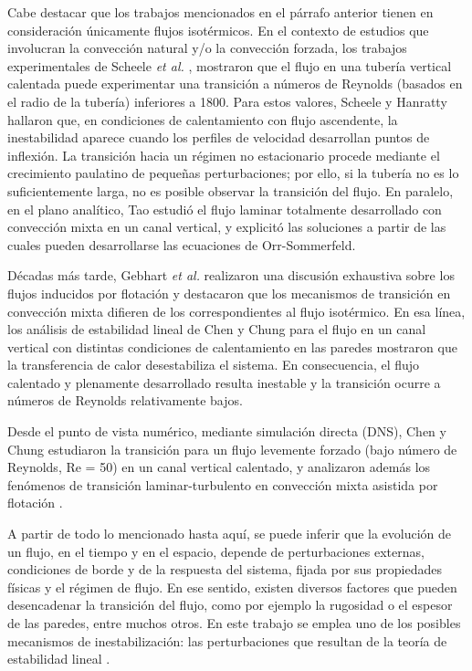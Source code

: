 Cabe destacar que los trabajos mencionados en el párrafo anterior tienen en consideración únicamente flujos isotérmicos. En el contexto de estudios que involucran la convección natural y/o la convección forzada, los trabajos experimentales de Scheele \textit{et al.}  \cite{scheele1960effect}, \cite{scheele1962effect} mostraron que el flujo en una tubería vertical calentada puede experimentar una transición a números de Reynolds (basados en el radio de la tubería) inferiores a 1800. Para estos valores, Scheele y \linebreak  Hanratty \cite{scheele1962effect} hallaron que, en condiciones de calentamiento con flujo ascendente, la inestabilidad aparece cuando los perfiles de velocidad \linebreak  desarrollan puntos de inflexión. La transición hacia un régimen no estacionario procede mediante el crecimiento paulatino de pequeñas perturbaciones; por ello, si la tubería no es lo suficientemente larga, no es posible observar la transición del flujo. En paralelo, en el plano analítico, Tao \cite{tao1960} estudió el flujo laminar totalmente desarrollado con convección mixta en un canal vertical, y explicitó las soluciones a partir de las cuales pueden desarrollarse las ecuaciones de Orr-Sommerfeld.

Décadas más tarde, Gebhart \textit{et al.} \cite{gebhart1989buoyancy} realizaron una discusión exhaustiva sobre los flujos inducidos por flotación y destacaron que los mecanismos de transición en convección mixta difieren de los correspondientes al flujo isotérmico. En esa línea, los análisis de estabilidad lineal de Chen y Chung para el flujo en un canal vertical con distintas condiciones de calentamiento en las paredes \cite{chen1996linear,chen1998stability} mostraron que la transferencia de calor desestabiliza el sistema. En consecuencia, el flujo calentado y plenamente desarrollado resulta inestable y la transición ocurre a números de Reynolds relativamente bajos.

Desde el punto de vista numérico, mediante simulación directa (DNS), Chen y Chung \cite{chen2002direct} estudiaron la transición para un flujo levemente forzado (bajo número de Reynolds, Re = 50) en un canal vertical calentado, y analizaron además los fenómenos de transición laminar-turbulento en convección mixta asistida por flotación \cite{chen2003direct}.

A partir de todo lo mencionado hasta aquí, se puede inferir que la evolución de un flujo, en el tiempo y en el espacio, depende de perturbaciones externas, condiciones de borde y de la respuesta del sistema, fijada por sus propiedades físicas y el régimen de flujo. En ese sentido, existen diversos factores que pueden desencadenar la transición del flujo, como por ejemplo la rugosidad o el espesor de las paredes, entre muchos otros. En este trabajo se emplea uno de los posibles mecanismos de inestabilización: las perturbaciones que resultan de la teoría de estabilidad lineal \cite{schmid}. 

